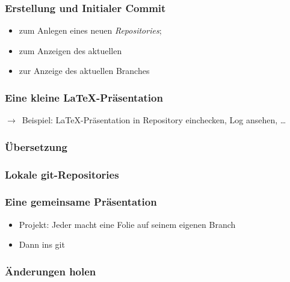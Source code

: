 \documentclass{cms-kurs}
\begin{document}
\begin{frame}
  \frametitle{Erstellung und Initialer Commit}

  \onslide<+->

  \begin{itemize}
  \item<+->  zum Anlegen eines neuen \emph{Repositories};
  \item<+->  zum Anzeigen des aktuellen
  \item<+->  zur Anzeige des aktuellen Branches
  \end{itemize}

\end{frame}

\begin{frame}
  \frametitle{Eine kleine \LaTeX-Präsentation}

  \onslide<+->

  $\to$~Beispiel: \LaTeX{}-Präsentation in Repository einchecken, Log ansehen, …

\end{frame}

\begin{frame}
  \frametitle{Übersetzung}


\end{frame}

\begin{frame}
  \frametitle{Lokale git-Repositories}


\end{frame}

\begin{frame}
  \frametitle{Eine gemeinsame Präsentation}


  \begin{itemize}
  \item Projekt: Jeder macht eine Folie auf seinem eigenen Branch
  \item Dann ins git
  \end{itemize}

\end{frame}

\begin{frame}
  \frametitle{Änderungen holen}

  \onslide<+->

\end{frame}
\end{document}
